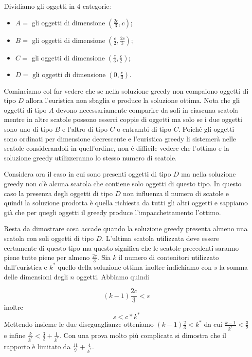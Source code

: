 Dividiamo gli oggetti in 4 categorie:
\begin{itemize}
    \item $A=$ gli oggetti di dimensione $\left(\frac{2c}{3}, c\right)$;
    \item $B=$ gli oggetti di dimensione $\left(\frac{c}{2}, \frac{2c}{3}\right)$;
    \item $C=$ gli oggetti di dimensione $\left(\frac{c}{3}, \frac{c}{2}\right)$;
    \item $D=$ gli oggetti di dimensione $\left(0, \frac{c}{3}\right)$.
\end{itemize}
Cominciamo col far vedere che se nella soluzione greedy non compaiono oggetti di tipo $D$ allora l'euristica non sbaglia e produce la soluzione ottima. Nota che gli oggetti di tipo $A$ devono necessariamente comparire da soli in ciascuna scatola mentre in altre scatole possono esserci coppie di oggetti ma solo se i due oggetti sono uno di tipo $B$ e l'altro di tipo $C$ o entrambi di tipo $C$. Poiché gli oggetti sono ordinati per dimensione decrescente e l'euristica greedy li sistemerà nelle scatole considerandoli in quell'ordine, non è difficile vedere che l'ottimo
e la soluzione greedy utilizzeranno lo stesso numero di scatole.

Considera ora il caso in cui sono presenti oggetti di tipo $D$ ma nella soluzione greedy non c'è alcuna scatola che contiene solo oggetti di questo tipo. In questo caso la presenza degli oggetti di tipo $D$ non influenza il numero di scatole e quindi la soluzione prodotta è quella richiesta da tutti gli altri oggetti e sappiamo già che per quegli oggetti il greedy produce l'impacchettamento l'ottimo.

Resta da dimostrare cosa accade quando la soluzione greedy presenta almeno una scatola con soli oggetti di tipo $D$. L'ultima scatola utilizzata deve essere certamente di questo tipo ma questo significa che le scatole precedenti saranno piene tutte piene per almeno $\frac{2c}{3}$. Sia $k$ il numero di contenitori utilizzato dall'euristica e $k^*$ quello della soluzione ottima inoltre indichiamo con $s$ la somma delle dimensioni degli $n$ oggetti. Abbiamo quindi 

\begin{equation*}
    (k-1)\frac{2c}{3}<s
\end{equation*}
inoltre
\begin{equation*}
    s<c*k^*
\end{equation*}
Mettendo insieme le due diseguaglianze otteniamo $(k-1)\frac{2}{3} < k^*$ da cui $\frac{k-1}{k^*} <\frac{3}{2}$ e infine $\frac{k}{k^*} < \frac{3}{2}+\frac{1}{k^*}$. Con una prova molto più complicata si dimostra che il rapporto è limitato da $\frac{11}{9}+\frac{4}{k^*}$.